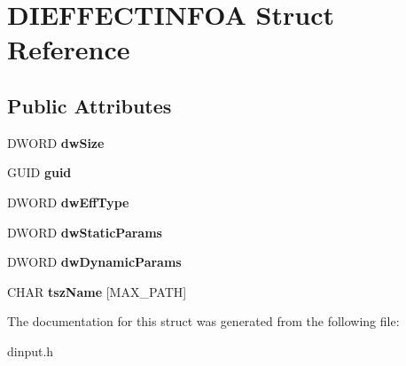 \hypertarget{struct_d_i_e_f_f_e_c_t_i_n_f_o_a}{\section{D\-I\-E\-F\-F\-E\-C\-T\-I\-N\-F\-O\-A Struct Reference}
\label{struct_d_i_e_f_f_e_c_t_i_n_f_o_a}
}
\subsection*{Public Attributes}
\begin{DoxyCompactItemize}
\item 
\hypertarget{struct_d_i_e_f_f_e_c_t_i_n_f_o_a_a3d5856b350d243827f2cf254d06c1f8f}{D\-W\-O\-R\-D {\bfseries dw\-Size}}\label{struct_d_i_e_f_f_e_c_t_i_n_f_o_a_a3d5856b350d243827f2cf254d06c1f8f}

\item 
\hypertarget{struct_d_i_e_f_f_e_c_t_i_n_f_o_a_a5bb7d2e866655b1dbf8d6d8701a79ddd}{G\-U\-I\-D {\bfseries guid}}\label{struct_d_i_e_f_f_e_c_t_i_n_f_o_a_a5bb7d2e866655b1dbf8d6d8701a79ddd}

\item 
\hypertarget{struct_d_i_e_f_f_e_c_t_i_n_f_o_a_a607591b7d095f48998a156301fa5e084}{D\-W\-O\-R\-D {\bfseries dw\-Eff\-Type}}\label{struct_d_i_e_f_f_e_c_t_i_n_f_o_a_a607591b7d095f48998a156301fa5e084}

\item 
\hypertarget{struct_d_i_e_f_f_e_c_t_i_n_f_o_a_a167bf6dbc98d9c1574f28453163bf850}{D\-W\-O\-R\-D {\bfseries dw\-Static\-Params}}\label{struct_d_i_e_f_f_e_c_t_i_n_f_o_a_a167bf6dbc98d9c1574f28453163bf850}

\item 
\hypertarget{struct_d_i_e_f_f_e_c_t_i_n_f_o_a_aba27999c4ff2ff6a53ad9da067704b94}{D\-W\-O\-R\-D {\bfseries dw\-Dynamic\-Params}}\label{struct_d_i_e_f_f_e_c_t_i_n_f_o_a_aba27999c4ff2ff6a53ad9da067704b94}

\item 
\hypertarget{struct_d_i_e_f_f_e_c_t_i_n_f_o_a_aef03846d4720ea37062c463d83cee771}{C\-H\-A\-R {\bfseries tsz\-Name} \mbox{[}M\-A\-X\-\_\-\-P\-A\-T\-H\mbox{]}}\label{struct_d_i_e_f_f_e_c_t_i_n_f_o_a_aef03846d4720ea37062c463d83cee771}

\end{DoxyCompactItemize}


The documentation for this struct was generated from the following file\-:\begin{DoxyCompactItemize}
\item 
dinput.\-h\end{DoxyCompactItemize}
